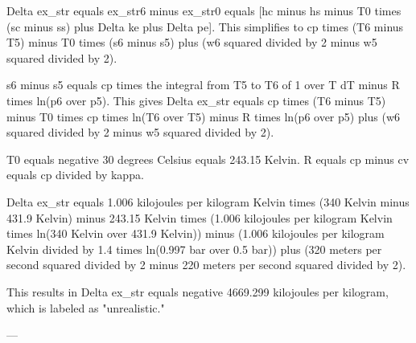 Delta ex_str equals ex_str6 minus ex_str0 equals [hc minus hs minus T0 times (sc minus ss) plus Delta ke plus Delta pe].  
This simplifies to cp times (T6 minus T5) minus T0 times (s6 minus s5) plus (w6 squared divided by 2 minus w5 squared divided by 2).  

s6 minus s5 equals cp times the integral from T5 to T6 of 1 over T dT minus R times ln(p6 over p5).  
This gives Delta ex_str equals cp times (T6 minus T5) minus T0 times cp times ln(T6 over T5) minus R times ln(p6 over p5) plus (w6 squared divided by 2 minus w5 squared divided by 2).  

T0 equals negative 30 degrees Celsius equals 243.15 Kelvin.  
R equals cp minus cv equals cp divided by kappa.  

Delta ex_str equals 1.006 kilojoules per kilogram Kelvin times (340 Kelvin minus 431.9 Kelvin) minus 243.15 Kelvin times (1.006 kilojoules per kilogram Kelvin times ln(340 Kelvin over 431.9 Kelvin)) minus (1.006 kilojoules per kilogram Kelvin divided by 1.4 times ln(0.997 bar over 0.5 bar)) plus (320 meters per second squared divided by 2 minus 220 meters per second squared divided by 2).  

This results in Delta ex_str equals negative 4669.299 kilojoules per kilogram, which is labeled as "unrealistic."  

---